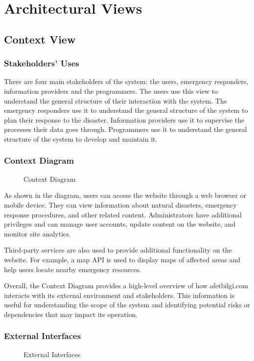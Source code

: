 \documentclass[a4paper]{article}
\begin{document}
    \section{Architectural Views}
    \subsection{Context View}
    \subsubsection{Stakeholders' Uses}
    There are four main stakeholders of the system: the users, emergency responders, information providers and the programmers.
    The users use this view to understand the general structure of their interaction with the system. The emergency responders
    use it to understand the general structure of the system to plan their response to the disaster. Information providers use it
    to supervise the processes their data goes through. Programmers use it to understand the general structure of the system to
    develop and maintain it.
    \subsubsection{Context Diagram}
    \begin{figure}
    
    \caption{Context Diagram}
    \end{figure}
        As shown in the diagram, users can access the website through a web browser or mobile device. They can view information about
        natural disasters, emergency response procedures, and other related content. Administrators have additional privileges and can
        manage user accounts, update content on the website, and monitor site analytics.

        Third-party services are also used to provide additional functionality on the website. For example, a map API is used to
        display maps of affected areas and help users locate nearby emergency resources.

        Overall, the Context Diagram provides a high-level overview of how afetbilgi.com interacts with its external environment and
        stakeholders. This information is useful for understanding the scope of the system and identifying potential risks or
        dependencies that may impact its operation.

    \subsubsection{External Interfaces}
    \begin{figure}
    
    \caption{External Interfaces}
    \end{figure}
\end{document}
